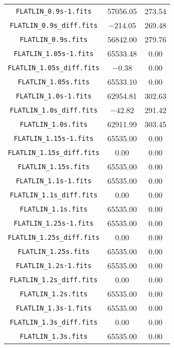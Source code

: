 \begin{table}[ht]
\begin{tabular}{ccc}
\verb|FLATLIN_0.9s-1.fits| & \num{57056.05} & \num{273.54}\\
\verb|FLATLIN_0.9s_diff.fits| & \num{-214.05} & \num{269.48}\\
\verb|FLATLIN_0.9s.fits| & \num{56842.00} & \num{279.76}\\
\verb|FLATLIN_1.05s-1.fits| & \num{65533.48} & \num{0.00}\\
\verb|FLATLIN_1.05s_diff.fits| & \num{-0.38} & \num{0.00}\\
\verb|FLATLIN_1.05s.fits| & \num{65533.10} & \num{0.00}\\
\verb|FLATLIN_1.0s-1.fits| & \num{62954.81} & \num{302.63}\\
\verb|FLATLIN_1.0s_diff.fits| & \num{-42.82} & \num{291.42}\\
\verb|FLATLIN_1.0s.fits| & \num{62911.99} & \num{303.45}\\
\verb|FLATLIN_1.15s-1.fits| & \num{65535.00} & \num{0.00}\\
\verb|FLATLIN_1.15s_diff.fits| & \num{0.00} & \num{0.00}\\
\verb|FLATLIN_1.15s.fits| & \num{65535.00} & \num{0.00}\\
\verb|FLATLIN_1.1s-1.fits| & \num{65535.00} & \num{0.00}\\
\verb|FLATLIN_1.1s_diff.fits| & \num{0.00} & \num{0.00}\\
\verb|FLATLIN_1.1s.fits| & \num{65535.00} & \num{0.00}\\
\verb|FLATLIN_1.25s-1.fits| & \num{65535.00} & \num{0.00}\\
\verb|FLATLIN_1.25s_diff.fits| & \num{0.00} & \num{0.00}\\
\verb|FLATLIN_1.25s.fits| & \num{65535.00} & \num{0.00}\\
\verb|FLATLIN_1.2s-1.fits| & \num{65535.00} & \num{0.00}\\
\verb|FLATLIN_1.2s_diff.fits| & \num{0.00} & \num{0.00}\\
\verb|FLATLIN_1.2s.fits| & \num{65535.00} & \num{0.00}\\
\verb|FLATLIN_1.3s-1.fits| & \num{65535.00} & \num{0.00}\\
\verb|FLATLIN_1.3s_diff.fits| & \num{0.00} & \num{0.00}\\
\verb|FLATLIN_1.3s.fits| & \num{65535.00} & \num{0.00}\\
\bottomrule
\end{tabular}
\end{table}